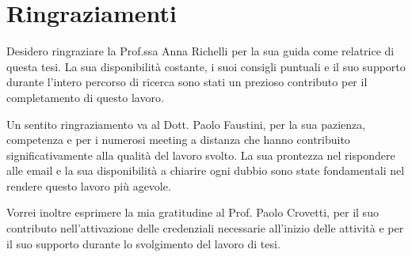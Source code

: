 \chapter*{Ringraziamenti}

Desidero ringraziare la Prof.ssa Anna Richelli per la sua guida come relatrice di questa tesi. La sua disponibilità costante, i suoi consigli puntuali e il suo supporto durante l'intero percorso di ricerca sono stati un prezioso contributo per il completamento di questo lavoro.

Un sentito ringraziamento va al Dott. Paolo Faustini, per la sua pazienza, competenza e per i numerosi meeting a distanza che hanno contribuito significativamente alla qualità del lavoro svolto. La sua prontezza nel rispondere alle email e la sua disponibilità a chiarire ogni dubbio sono state fondamentali nel rendere questo lavoro più agevole.

Vorrei inoltre esprimere la mia gratitudine al Prof. Paolo Crovetti, per il suo contributo nell'attivazione delle credenziali necessarie all'inizio delle attività e per il suo supporto durante lo svolgimento del lavoro di tesi.